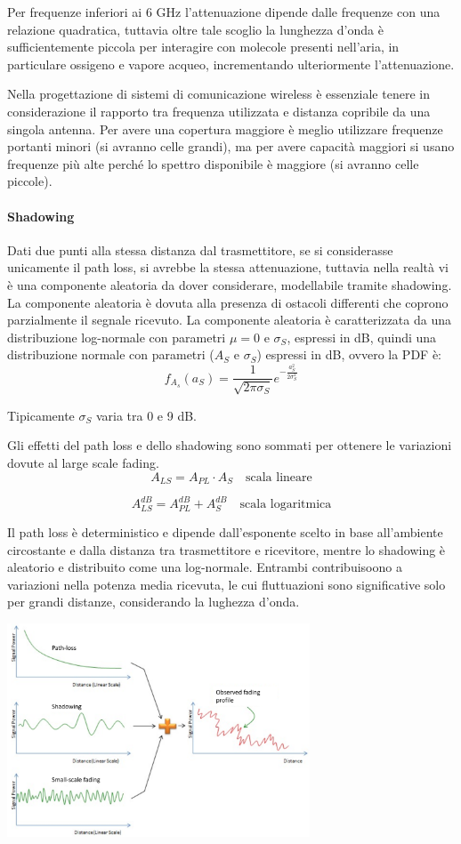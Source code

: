Per frequenze inferiori ai 6 GHz l'attenuazione dipende dalle frequenze con una relazione quadratica, tuttavia oltre tale scoglio la lunghezza d'onda è sufficientemente piccola per interagire con molecole presenti nell'aria, in particulare ossigeno e vapore acqueo, incrementando ulteriormente l'attenuazione.

Nella progettazione di sistemi di comunicazione wireless è essenziale tenere in considerazione il rapporto tra frequenza utilizzata e distanza copribile da una singola antenna.
Per avere una copertura maggiore è meglio utilizzare frequenze portanti minori (si avranno celle grandi), ma per avere capacità maggiori si usano frequenze più alte perché lo spettro disponibile è maggiore (si avranno celle piccole).
\paragraph*{Shadowing}

Dati due punti alla stessa distanza dal trasmettitore, se si considerasse unicamente il path loss, si avrebbe la stessa attenuazione,
tuttavia nella realtà vi è una componente aleatoria da dover considerare, modellabile tramite shadowing.
La componente aleatoria è dovuta alla presenza di ostacoli differenti che coprono parzialmente il segnale ricevuto.
La componente aleatoria è caratterizzata da una distribuzione log-normale con parametri $\mu = 0$ e $\sigma_S$, espressi in dB, quindi una distribuzione normale con parametri ($A_S$ e $\sigma_S$) espressi in dB,
ovvero la PDF è:
\[
    f_{A_s}(a_S) = \frac{1}{\sqrt{2\pi \sigma_S}} e^{-\frac{a_S^2}{2\sigma_S^2}}
\]

Tipicamente $\sigma_S$ varia tra 0 e 9 dB.



Gli effetti del path loss e dello shadowing sono sommati per ottenere le variazioni dovute al large scale fading.
\[
    A_{LS} = A_{PL} \cdot A_S \quad \text{scala lineare}
\]

\[
    A_{LS}^{dB} = A_{PL}^{dB} + A_S^{dB} \quad \text{scala logaritmica}
\]


Il path loss è deterministico e dipende dall'esponente scelto in base all'ambiente circostante e dalla distanza tra trasmettitore e ricevitore,
mentre lo shadowing è aleatorio e distribuito come una log-normale.
Entrambi contribuisoono a variazioni nella potenza media ricevuta, le cui fluttuazioni sono significative solo per grandi distanze, considerando la lughezza d'onda.

\begin{center}
    \includegraphics[width=0.675\textwidth]{imgs/fading_sum.jpg}
\end{center}
